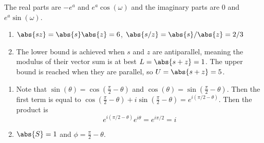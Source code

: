 \documentclass[a4paper]{article}
\begin{document}
The real parts are \(-e^{a}\) and \(e^{a} \cos\left( \omega  \right)\) and the imaginary parts are \(0\) and \(e^{a} \sin\left( \omega  \right)\).

\vspace{12pt}


\begin{enumerate}[label=(\alph*)]
	\item \(\abs{sz} = \abs{s}\abs{z} = 6\), \(\abs{s / z} = \abs{s}/\abs{z} = 2/3\)
	\item The lower bound is achieved when \(s\) and \(z\) are antiparallel, meaning the modulus of their vector sum is at best \(L = \abs{s + z} = 1\). The upper bound is reached when they are parallel, so \(U = \abs{s + z} = 5\).
\end{enumerate}

\newpage

\begin{enumerate}[label=(\alph*)]
	\item Note that \(\sin\left( \theta  \right) = \displaystyle{\cos\left( \frac{\pi }{2} - \theta  \right)}\) and \(\cos\left( \theta  \right) = \displaystyle{\sin\left( \frac{\pi }{2} - \theta  \right)}\). Then the first term is equal to \(\displaystyle{\cos\left( \frac{\pi }{2} - \theta  \right) + i \sin\left( \frac{\pi }{2} - \theta  \right) = e^{i \!\left( \pi / 2 - \theta  \right) }}\). Then the product is
	\[
		e^{i \!\left( \pi / 2 - \theta  \right) } e^{i \theta } = e^{i \pi / 2} = i
	\]
	\item \(\abs{S} = 1\) and \(\displaystyle{\phi = \frac{\pi }{2} - \theta }\).
\end{enumerate}
\end{document}
